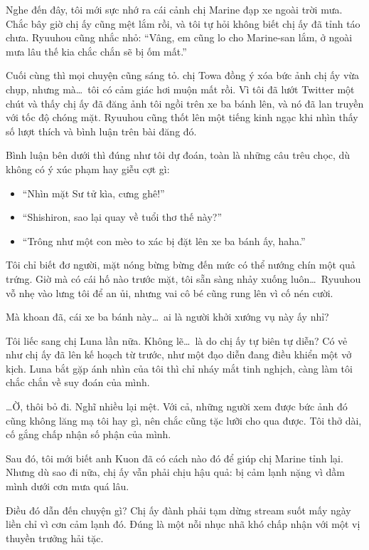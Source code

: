 \documentclass[../main.tex]{subfiles}
\begin{document}
Nghe đến đây, tôi mới sực nhớ ra cái cảnh chị Marine đạp xe ngoài trời mưa. Chắc bây giờ chị ấy cũng mệt lắm rồi, và tôi tự hỏi không biết chị ấy đã tỉnh táo chưa. Ryuuhou cũng nhắc nhỏ: ``Vâng, em cũng lo cho Marine-san lắm, ở ngoài mưa lâu thế kia chắc chắn sẽ bị ốm mất.''

Cuối cùng thì mọi chuyện cũng sáng tỏ. chị Towa đồng ý xóa bức ảnh chị ấy vừa chụp, nhưng mà\dots\ tôi có cảm giác hơi muộn mất rồi. Vì tôi đã lướt Twitter một chút và thấy chị ấy đã đăng ảnh tôi ngồi trên xe ba bánh lên, và nó đã lan truyền với tốc độ chóng mặt. Ryuuhou cũng thốt lên một tiếng kinh ngạc khi nhìn thấy số lượt thích và bình luận trên bài đăng đó.

Bình luận bên dưới thì đúng như tôi dự đoán, toàn là những câu trêu chọc, dù không có ý xúc phạm hay giễu cợt gì:

\begin{itemize}
  \item ``Nhìn mặt Sư tử kìa, cưng ghê!''
  \item ``Shishiron, sao lại quay về tuổi thơ thế này?''
  \item ``Trông như một con mèo to xác bị đặt lên xe ba bánh ấy, haha.''
\end{itemize}

Tôi chỉ biết đơ người, mặt nóng bừng bừng đến mức có thể nướng chín một quả trứng. Giờ mà có cái hố nào trước mặt, tôi sẵn sàng nhảy xuống luôn\dots\ Ryuuhou vỗ nhẹ vào lưng tôi để an ủi, nhưng vai cô bé cũng rung lên vì cố nén cười.

Mà khoan đã, cái xe ba bánh này\dots\ ai là người khởi xướng vụ này ấy nhỉ?

Tôi liếc sang chị Luna lần nữa. Không lẽ\dots\ là do chị ấy tự biên tự diễn? Có vẻ như chị ấy đã lên kế hoạch từ trước, như một đạo diễn đang điều khiển một vở kịch. Luna bắt gặp ánh nhìn của tôi thì chỉ nháy mắt tinh nghịch, càng làm tôi chắc chắn về suy đoán của mình.

\dots Ờ, thôi bỏ đi. Nghĩ nhiều lại mệt. Với cả, những người xem được bức ảnh đó cũng không lăng mạ tôi hay gì, nên chắc cũng tặc lưỡi cho qua được. Tôi thở dài, cố gắng chấp nhận số phận của mình.

\ct

Sau đó, tôi mới biết anh Kuon đã có cách nào đó để giúp chị Marine tỉnh lại. Nhưng dù sao đi nữa, chị ấy vẫn phải chịu hậu quả: bị cảm lạnh nặng vì dầm mình dưới cơn mưa quá lâu.

Điều đó dẫn đến chuyện gì? Chị ấy đành phải tạm dừng stream suốt mấy ngày liền chỉ vì cơn cảm lạnh đó. Đúng là một nỗi nhục nhã khó chấp nhận với một vị thuyền trưởng hải tặc.
\end{document}
